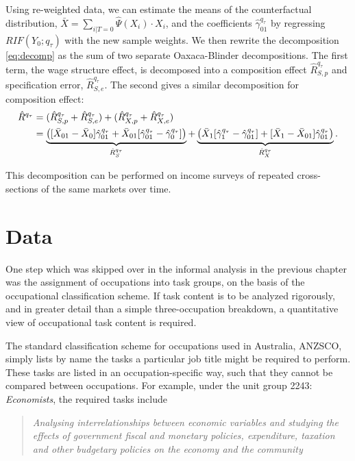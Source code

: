 Using re-weighted data, we can estimate the means of the counterfactual distribution, $\bar{X}=\sum_{i|T=0}\hat{\Psi}(X_i) \cdot X_i$, and the coefficients $\hat{\gamma}_{01}^{q_\tau}$ by regressing $RIF(Y_0;q_\tau)$ with the new sample weights. We then rewrite the decomposition \eqref{eq:decomp} as the sum of two separate Oaxaca-Blinder decompositions. The first term, the wage structure effect, is decomposed into a composition effect $\hat{R}^{q_\tau}_{S,p}$ and specification error, $\hat{R}^{q_\tau}_{S,e}$. The second gives a similar decomposition for composition effect:
\begin{align}
  \hat{R}^{q_\tau} &= (\hat{R}^{q_\tau}_{S,p} + \hat{R}^{q_\tau}_{S,e}) + (\hat{R}^{q_\tau}_{X,p} + \hat{R}^{q_\tau}_{X,e}) \notag \\
  &= \underbrace{\left( [\bar{X}_{01} - \bar{X}_0 ] \hat{\gamma}^{q_\tau}_{01} +
    \bar{X}_{01}[\hat{\gamma}_{01}^{q_\tau} - \hat{\gamma}_0^{q_\tau}] \right)}_{\hat{R}^{q_\tau}_{S}} +
  \underbrace{\left( \bar{X}_{1}[\hat{\gamma}_{1}^{q_\tau} - \hat{\gamma}_{01}^{q_\tau}] + 
    [\bar{X}_{1} - \bar{X}_{01} ] \hat{\gamma}^{q_\tau}_{01}\right)}_{\hat{R}^{q_\tau}_{X}}.
\end{align}

This decomposition can be performed on income surveys of repeated cross-sections of the same markets over time.

\section{Data}

One step which was skipped over in the informal analysis in the previous chapter was the assignment of occupations into task groups, on the basis of the occupational classification scheme. If task content is to be analyzed rigorously, and in greater detail than a simple three-occupation breakdown, a quantitative view of occupational task content is required. 

The standard classification scheme for occupations used in Australia, ANZSCO, simply lists by name the tasks a particular job title might be required to perform. These tasks are listed in an occupation-specific way, such that they cannot be compared between occupations. For example, under the unit group 2243: {\em Economists}, the required tasks include
\begin{quote}
{\em Analysing interrelationships between economic variables and studying the effects of government fiscal and monetary policies, expenditure, taxation and other budgetary policies on the economy and the community \citep[p.185]{Trewin2006}}
\end{quote}

